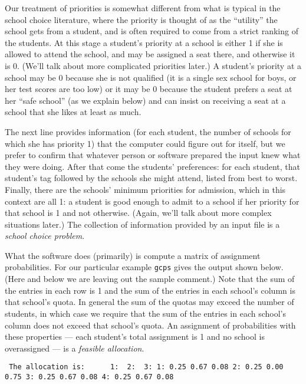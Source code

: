 \documentclass[12pt]{article}
\theoremstyle{definition}
\begin{document}
Our treatment of priorities is somewhat different from what is typical
in the school choice literature, where the priority is thought of as
the ``utility'' the school gets from a student, and is often required
to come from a strict ranking of the students.  At this stage a
student's priority at a school is either 1 if she is allowed to attend
the school, and may be assigned a seat there, and otherwise it is 0.
(We'll talk about more complicated priorities later.)  A student's
priority at a school may be 0 because she is not qualified (it is a
single sex school for boys, or her test scores are too low) or it may
be 0 because the student prefers a seat at her ``safe school'' (as we
explain below) and can insist on receiving a seat at a school that she
likes at least as much.

The next line provides information (for each student, the number of
schools for which she has priority 1) that the computer could figure
out for itself, but we prefer to confirm that whatever person or
software prepared the input knew what they were doing.  After that
come the students' preferences: for each student, that student's tag
followed by the schools she might attend, listed from best to worst.
Finally, there are the schools' minimum priorities for admission,
which in this context are all 1: a student is good enough to admit to
a school if her priority for that school is 1 and not
otherwise. (Again, we'll talk about more complex situations later.)
The collection of information provided by an input file is a
\emph{school choice problem}.

What the software does (primarily) is compute a matrix of assignment
probabilities.  For our particular example \texttt{gcps} gives the
output shown below.  (Here and below we are leaving out the sample
comment.)  Note that the sum of the entries in each row is 1 and the
sum of the entries in each school's column is that school's quota.  In
general the sum of the quotas may exceed the number of students, in
which case we require that the sum of the entries in each school's
column does not exceed that school's quota. An assignment of
probabilities with these properties --- each student's total
assignment is 1 and no school is overassigned --- is a \emph{feasible
allocation}.
\medskip
\begin{obeylines}\texttt{
The allocation is:
\ \ \ \ \ 1:    \    2:  \      3:
1:      0.25     0.67     0.08
2:      0.25     0.00     0.75
3:      0.25     0.67     0.08
4:      0.25     0.67     0.08
}
\end{obeylines} \noindent
\end{document}
